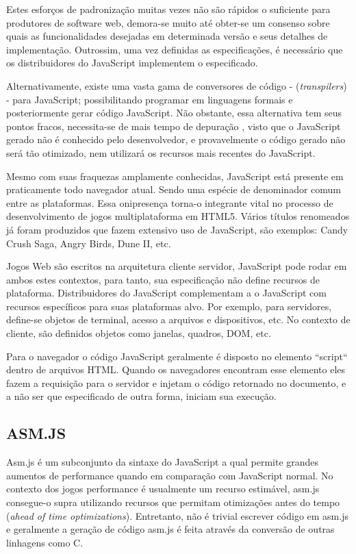 \documentclass[
12pt,
a4paper,
portuges,
draft
]{report}
\begin{document}
Estes esforços de padronização muitas vezes não são rápidos
o suficiente para produtores de software web, demora-se muito até
obter-se um consenso sobre quais as funcionalidades desejadas em
determinada versão e seus detalhes de implementação. Outrossim, uma
vez definidas as especificações, é necessário que os distribuidores
do JavaScript implementem o especificado.

Alternativamente, existe uma vasta gama de conversores de código -
(\textit{transpilers}) - para JavaScript; possibilitando programar em
linguagens formais e posteriormente gerar código JavaScript. Não
obstante, essa alternativa tem seus pontos fracos, necessita-se de mais
tempo de depuração , visto que o JavaScript gerado não é conhecido
pelo desenvolvedor, e provavelmente o código gerado não será tão
otimizado, nem utilizará os recursos mais recentes do JavaScript.

Mesmo com suas fraquezas amplamente conhecidas, JavaScript está
presente em praticamente todo navegador atual. Sendo uma espécie de
denominador comum entre as plataformas. Essa onipresença torna-o
integrante vital no processo de desenvolvimento de jogos multiplataforma
em HTML5. Vários títulos renomeados já foram produzidos que fazem
extensivo uso de JavaScript, são exemplos: Candy Crush Saga, Angry
Birds, Dune II, etc.

Jogos Web são escritos na arquitetura cliente servidor, JavaScript pode
rodar em ambos estes contextos, para tanto, sua especificação não
define recursos de plataforma. Distribuidores do JavaScript complementam
a o JavaScript com recursos específicos para suas plataformas alvo.
Por exemplo, para servidores, define-se objetos de terminal, acesso a
arquivos e dispositivos, etc. No contexto de cliente, são definidos
objetos como janelas, quadros, DOM, etc.

Para o navegador o código JavaScript geralmente é disposto no elemento
``script`` dentro de arquivos HTML. Quando os navegadores encontram esse
elemento eles fazem a requisição para o servidor e injetam o código
retornado no documento, e a não ser que especificado de outra forma,
iniciam sua execução.


\subsection{ASM.JS}
Asm.js é um subconjunto da sintaxe do JavaScript a qual permite grandes
aumentos de performance quando em comparação com JavaScript normal.
No contexto dos jogos performance é usualmente um recurso estimável,
asm.js consegue-o supra utilizando recursos que permitam otimizações
antes do tempo (\textit{ahead of time optimizations}). Entretanto, não é
trivial escrever código em asm.js e geralmente a geração de código
asm.js é feita através da conversão de outras linhagens como C.
\end{document}
